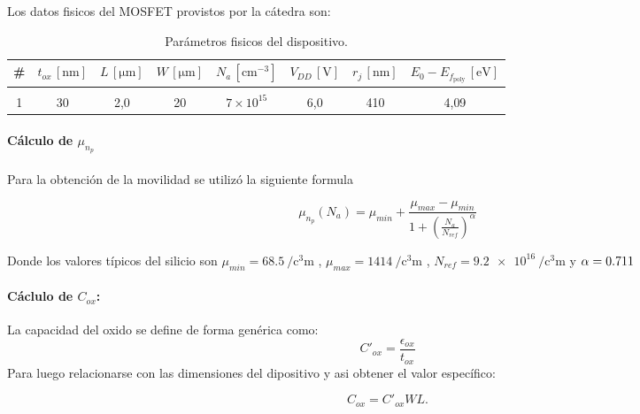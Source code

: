 \documentclass[a4paper, twoside, 10pt, spanish]{article}
\numberwithin{table}{section}
\begin{document}
Los datos fisicos del MOSFET provistos por la cátedra son: 

\begin{table}[ht] 
	\centering
	 \begin{tabular}{c c c c c c c c}
	 	 \hline \# &
	 	  $t_{ox}\,[\mathrm{nm}]$ &
	 	   $L\,[\mathrm{\mu m}]$ &
	 	    $W\,[\mathrm{\mu m}]$ &
	 	     $N_a\,[\mathrm{cm}^{-3}]$ &
	 	      $V_{DD}\,[\mathrm{V}]$ &
	 	       $r_j\,[\mathrm{nm}]$ &
	 	        $E_0 - E_{f_{\mathrm{poly}}}\,[\mathrm{eV}]$ \\ 
	 	        \hline 
	 	        \\
	 	        1 & 30 & 2{,}0 & 20 & $7 \times 10^{15}$ & 6{,}0 & 410 & 4{,}09 \\ \hline \end{tabular} \caption{Parámetros fisicos del dispositivo.} \label{tab:parametros-dispositivo} \end{table}

\paragraph{Cálculo de $\mu_{n_p}$}

Para la obtención de la movilidad se utilizó la siguiente formula 

\begin{equation*}
	\mu_{n_p}(N_a) = \mu_{min} + \frac{\mu_{max} - \mu_{min}}{1+\left(\frac{N_a}{N_{ref}}\right)^\alpha}
\end{equation*}

Donde los valores típicos del silicio son $\mu_{min} = \SI{68.5}{\per\cubic\centi\meter}$ , $\mu_{max} = \SI{1414}{\per\cubic\centi\meter}$ , $N_{ref} = \SI{9.2e16}{\per\cubic\centi\meter}$ y $\alpha = \SI{0.711}{}\\$

\paragraph{Cáclulo de $C_{ox}$:}

La capacidad del oxido se define de forma genérica como: 
\begin{equation*}
	C'_{ox} = \frac{\epsilon_{ox}}{t_{ox}}
\end{equation*}
Para luego relacionarse con las dimensiones del dipositivo y asi obtener el valor específico: 

\begin{equation*}
	C_{ox} = C'_{ox} W L.
\end{equation*}
\end{document}
